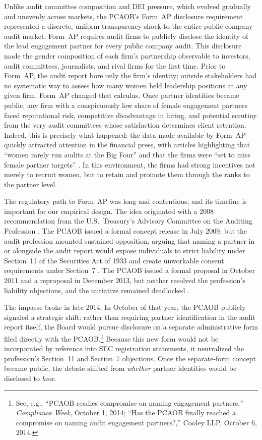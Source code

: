 \documentclass[11pt]{article}
\begin{document}
            Unlike audit committee composition and DEI pressure, which evolved gradually and unevenly across markets, the PCAOB's Form~AP disclosure requirement represented a discrete, uniform transparency shock to the entire public company audit market. Form~AP requires audit firms to publicly disclose the identity of the lead engagement partner for every public company audit. This disclosure made the gender composition of each firm's partnership observable to investors, audit committees, journalists, and rival firms for the first time. Prior to Form~AP, the audit report bore only the firm's identity; outside stakeholders had no systematic way to assess how many women held leadership positions at any given firm. Form~AP changed that calculus. Once partner identities became public, any firm with a conspicuously low share of female engagement partners faced reputational risk, competitive disadvantage in hiring, and potential scrutiny from the very audit committees whose satisfaction determines client retention. Indeed, this is precisely what happened: the data made available by Form~AP quickly attracted attention in the financial press, with articles highlighting that ``women rarely run audits at the Big Four'' \parencite{rapoportWomenRarelyRun2018} and that the firms were ``set to miss female partner targets'' \parencite{kissinBigFourAccounting2025, lucasWhyFewWomen2025}. In this environment, the firms had strong incentives not merely to recruit women, but to retain and promote them through the ranks to the partner level. 

            The regulatory path to Form~AP was long and contentious, and its timeline is important for our empirical design. The idea originated with a 2008 recommendation from the U.S.\ Treasury's Advisory Committee on the Auditing Profession \parencite{pcaobConceptRelease2009}. The PCAOB issued a formal concept release in July 2009, but the audit profession mounted sustained opposition, arguing that naming a partner in or alongside the audit report would expose individuals to strict liability under Section~11 of the Securities Act of 1933 and create unworkable consent requirements under Section~7 \parencite{pcaobAdoptionFormAP2015}. The PCAOB issued a formal proposal in October 2011 and a reproposal in December 2013, but neither resolved the profession's liability objections, and the initiative remained deadlocked \parencite{cunninghamInitialEvidenceAudit2019}.

            The impasse broke in late 2014. In October of that year, the PCAOB publicly signaled a strategic shift: rather than requiring partner identification in the audit report itself, the Board would pursue disclosure on a separate administrative form filed directly with the PCAOB.\footnote{See, e.g., ``PCAOB readies compromise on naming engagement partners,'' \textit{Compliance Week}, October 1, 2014; ``Has the PCAOB finally reached a compromise on naming audit engagement partners?,'' Cooley LLP, October 6, 2014.} Because this new form would not be incorporated by reference into SEC registration statements, it neutralized the profession's Section~11 and Section~7 objections. Once the separate-form concept became public, the debate shifted from \textit{whether} partner identities would be disclosed to \textit{how}.
\end{document}
